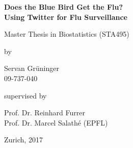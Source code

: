 \documentclass[11pt, a4paper,twoside]{report}\usepackage[]{graphicx}\usepackage[]{color}
\renewcommand\familydefault{\sfdefault}
\newcommand{\bigtitle}{Does the Blue Bird Get the Flu?}
\newcommand{\subtitle}{Using Twitter for Flu Surveillance}
\newcommand{\mytitle}[3]{}
\begin{document}
\renewcommand{\baselinestretch}{1.5}\normalfont
\begin{center}
\setlength{\parindent}{0cm}
\bf\Large%
Does the Blue Bird Get the Flu?\\
Using Twitter for Flu Surveillance
\normalfont



\hrulefill

\vspace*{4cm}

\large
Master Thesis in Biostatistics (STA495)
\vspace*{12mm}

by

\vspace*{12mm}

Servan Grüninger\\
\small 09-737-040\\
\normalfont
\vspace*{4cm}

supervised by

\vspace*{1cm}

Prof. Dr. Reinhard Furrer\\
Prof. Dr. Marcel Salathé (EPFL)

\vfill

Zurich, 2017
\end{center}
\renewcommand\familydefault{\rmdefault}\normalfont%
\setcounter{page}{0}
\thispagestyle{empty}
\cleardoublepage


\pagestyle{standard}

\end{document}
